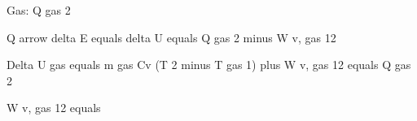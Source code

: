 Gas: Q gas 2

Q arrow delta E equals delta U equals Q gas 2 minus W v, gas 12

Delta U gas equals m gas Cv (T 2 minus T gas 1) plus W v, gas 12 equals Q gas 2

W v, gas 12 equals